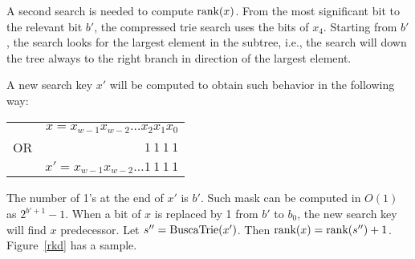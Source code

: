 \documentclass[11pt]{article}
\newcommand{\rk}[1]{\mbox{\rm{rank}}(#1)}
\newcommand{\trs}[1]{\mbox{\rm{BuscaTrie}}(#1)}
\begin{document}
A second search is needed to compute $\rk{x}$. From the most significant bit to the relevant bit $b'$, the compressed trie search uses the bits of $x_4$. Starting from $b'$, the search looks for the largest element in the subtree, i.e., the search will down the tree always to the right branch in direction of the largest element.

A new search key $x'$ will be computed to obtain such behavior in the following way:




\begin{tabular}{rr}
& $x =x_{w-1}x_{w-2} \ldots x_2x_1x_0$\\
OR & $ 1~ 1 ~1 ~1 $  \\ \hline
&$x' = x_{w-1}x_{w-2} \ldots 1~1~1~1$
\end{tabular}

The number of 1’s at the end of $x'$ is $b'$. Such mask can be computed in $O(1)$ as $2^{b'+1}-1$.
When a bit of $x$ is replaced by 1 from $b'$ to $b_0$, the new search key will find $x$ predecessor. Let $s''=\trs{x'}$. Then $\rk{x}=\rk{s''}+1$. Figure~\ref{rkd} has a sample.
\end{document}
